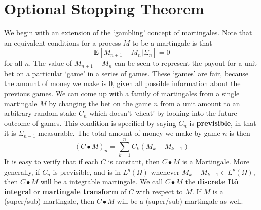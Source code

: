 \section{Optional Stopping Theorem}

We begin with an extension of the `gambling' concept of martingales. Note that an equivalent conditions for a process $M$ to be a martingale is that
%
\[ \mathbf{E}[M_{n+1} - M_n | \Sigma_n] = 0 \]
%
for all $n$. The value of $M_{n+1} - M_n$ can be seen to represent the payout for a unit bet on a particular `game' in a series of games. These `games' are fair, because the amount of money we make is 0, given all possible information about the previous games. We can come up with a family of martingales from a single martingale $M$ by changing the bet on the game $n$ from a unit amount to an arbitrary random stake $C_n$ which doesn't `cheat' by looking into the future outcome of games. This condition is specified by saying $C_n$ is {\bf previsible}, in that it is $\Sigma_{n-1}$ measurable. The total amount of money we make by game $n$ is then
%
\[ (C \bullet M)_n = \sum_{k = 1}^n C_k(M_k - M_{k-1}) \]
%
It is easy to verify that if each $C$ is constant, then $C \bullet M$ is a Martingale. More generally, if $C_n$ is previsible, and is in $L^q(\Omega)$ whenever $M_k - M_{k-1} \in L^p(\Omega)$, then $C \bullet M$ will be a integrable martingale. We call $C \bullet M$ the {\bf discrete It\^{o} integral} or {\bf martingale transform} of $C$ with respect to $M$. If $M$ is a (super/sub) martingale, then $C \bullet M$ will be a (super/sub) martingale as well.

